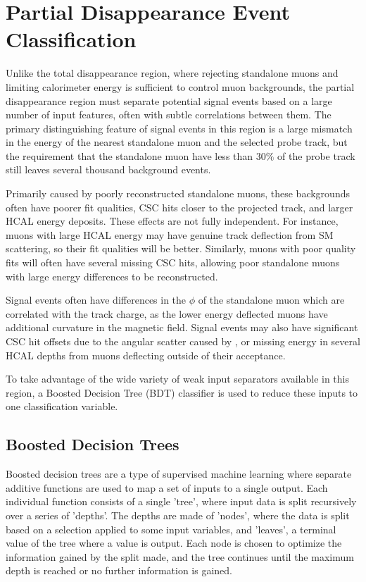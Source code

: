 \chapter{Partial Disappearance Event Classification}
\label{sec:BDT}
Unlike the total disappearance region, where rejecting standalone muons and limiting calorimeter energy is sufficient to control muon backgrounds, the partial disappearance region must separate potential signal events based on a large number of input features, often with subtle correlations between them.
The primary distinguishing feature of signal events in this region is a large mismatch in the energy of the nearest standalone muon and the selected probe track, but the requirement that the standalone muon have less than 30$\%$ of the probe track still leaves several thousand background events.

Primarily caused by poorly reconstructed standalone muons, these backgrounds often have poorer fit qualities, CSC hits closer to the projected track, and larger HCAL energy deposits.
These effects are not fully independent.
For instance, muons with large HCAL energy may have genuine track deflection from SM scattering, so their fit qualities will be better.
Similarly, muons with poor quality fits will often have several missing CSC hits, allowing poor standalone muons with large energy differences to be reconstructed.

Signal events often have differences in the $\phi$ of the standalone muon which are correlated with the track charge, as the lower energy deflected muons have additional curvature in the magnetic field.
Signal events may also have significant CSC hit offsets due to the angular scatter caused by \dbrem, or missing energy in several HCAL depths from muons deflecting outside of their acceptance.

To take advantage of the wide variety of weak input separators available in this region, a Boosted Decision Tree (BDT) classifier is used to reduce these inputs to one classification variable.

\section{Boosted Decision Trees}
Boosted decision trees are a type of supervised machine learning where separate additive functions are used to map a set of inputs to a single output.
Each individual function consists of a single 'tree', where input data is split recursively over a series of 'depths'. 
The depths are made of 'nodes', where the data is split based on a selection applied to some input variables, and 'leaves', a terminal value of the tree where a value is output.
Each node is chosen to optimize the information gained by the split made, and the tree continues until the maximum depth is reached or no further information is gained.

